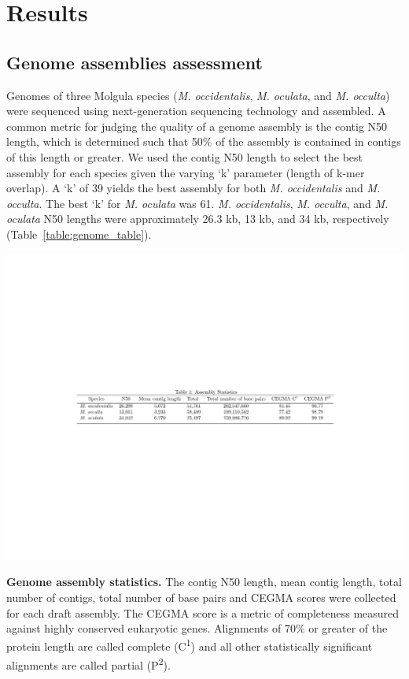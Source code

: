 \section{Results}
\subsection{Genome assemblies assessment}
Genomes of three Molgula species (\textit{M. occidentalis}, \textit{M. oculata}, and \textit{M. occulta}) were sequenced using next-generation sequencing technology and assembled. A common metric for judging the quality of a genome assembly is the contig N50 length, which is determined such that 50\% of the assembly is contained in contigs of this length or greater. We used the contig N50 length to select the best assembly for each species given the varying `k' parameter (length of k-mer overlap). A `k' of 39 yields the best assembly for both \textit{M. occidentalis} and \textit{M. occulta}. The best `k' for \textit{M. oculata} was 61. \textit{M. occidentalis}, \textit{M. occulta}, and \textit{M. oculata} N50 lengths were approximately 26.3 kb, 13 kb, and 34 kb, respectively (Table~\ref{table:genome_table}).

\begin{table}[tbp]
\centering
\includegraphics[width=\linewidth]{figures/genome_table_1}
\caption{\textbf{Genome assembly statistics.} The contig N50 length, mean contig length, total number of contigs, total number of base pairs and CEGMA scores were collected for each draft assembly. The CEGMA score is a metric of completeness measured against highly conserved eukaryotic genes. Alignments of 70\% or greater of the protein length are called complete (C\textsuperscript{1}) and all other statistically significant alignments are called partial (P\textsuperscript{2}).}
\label{table:genome_table}
\end{table}


